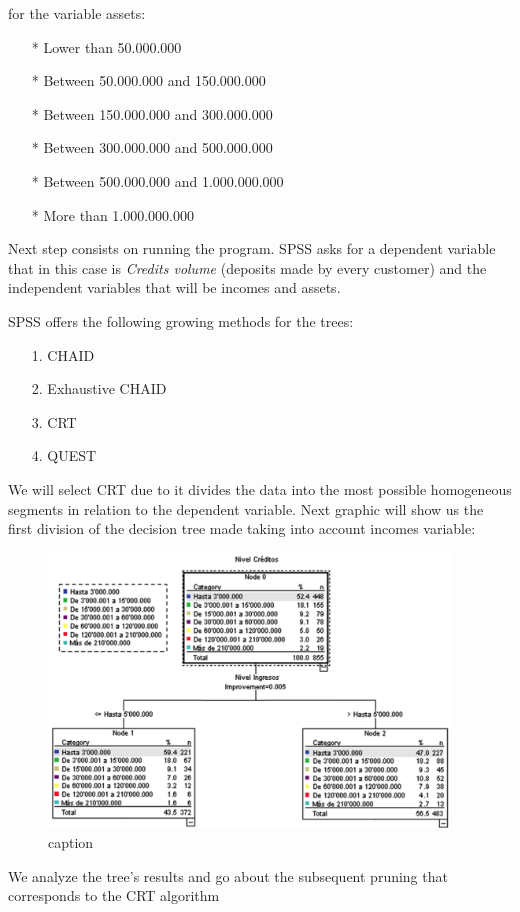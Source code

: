 for the variable assets:
\begin{itemize}
\item[*] Lower than 50.000.000
\item[*] Between 50.000.000 and 150.000.000
\item[*] Between 150.000.000 and 300.000.000
\item[*] Between 300.000.000 and 500.000.000
\item[*] Between 500.000.000 and 1.000.000.000
\item[*] More than 1.000.000.000
\end{itemize}
Next step consists on running the program.
SPSS asks for a dependent variable that in this case is \emph{Credits volume} (deposits made by every customer) and the independent variables that will be incomes and assets.

SPSS offers the following growing methods for the trees:
\begin{itemize}
\item[1.] CHAID
\item[2.] Exhaustive CHAID
\item[3.] CRT
\item[4.] QUEST
\end{itemize}
We will select CRT due to it divides the data into the most possible homogeneous segments in relation to the dependent variable.
Next graphic will show us the first division of the decision tree made taking into account incomes variable:
\begin{figure}[htbp]
  \centering
  \includegraphics[width=0.95\textwidth]{Imagen1}
  \caption{caption}
  \label{fig:label}
\end{figure}

We analyze the tree’s results and go about the subsequent pruning that corresponds to the CRT algorithm

